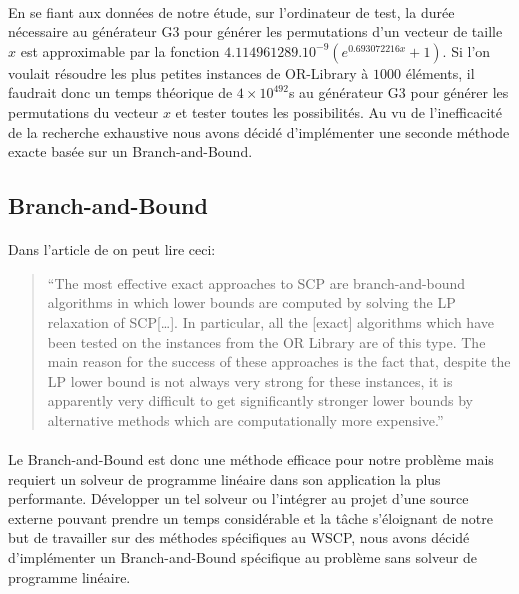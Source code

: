 \documentclass[12pt,letterpaper,twoside]{article}
\begin{document}
			\paragraph*{}
				En se fiant aux données de notre étude, sur l'ordinateur de test, la durée nécessaire au générateur G3 pour générer les permutations d'un vecteur de taille \(x\) est approximable par la fonction \(4.114961289.10^{-9}\left(e^{0.693072216x} + 1\right)\). Si l'on voulait résoudre les plus petites instances de OR-Library à \(1000\) éléments, il faudrait donc un temps théorique de \(4 \times 10^{492}\)s au générateur G3 pour générer les permutations du vecteur \(x\) et tester toutes les possibilités. Au vu de l'inefficacité de la recherche exhaustive nous avons décidé d'implémenter une seconde méthode exacte basée sur un Branch-and-Bound.
		\subsection{Branch-and-Bound}\label{sec:bnb}
			\paragraph*{}
				Dans l'article  de \citeauthor{caprara2000algorithms} on peut lire ceci:
				\begin{quote}
					``The most effective exact approaches to SCP are branch-and-bound algorithms in which lower bounds are computed by solving the LP relaxation of SCP[\ldots]. In particular, all the [exact] algorithms which have been tested on the instances from the OR Library are of this type. The main reason for the success of these approaches is the fact that, despite the LP lower bound is not always very strong for these instances, it is apparently very difficult to get significantly stronger lower bounds by alternative methods which are computationally more expensive.''~\cite{caprara2000algorithms}
				\end{quote}
			\paragraph*{}
				Le Branch-and-Bound est donc une méthode efficace pour notre problème mais requiert un solveur de programme linéaire dans son application la plus performante. Développer un tel solveur ou l'intégrer au projet d'une source externe pouvant prendre un temps considérable et la tâche s'éloignant de notre but de travailler sur des méthodes spécifiques au WSCP, nous avons décidé d'implémenter un Branch-and-Bound spécifique au problème sans solveur de programme linéaire.
\end{document}
